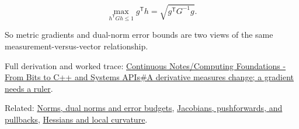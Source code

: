 \[
\max_{h^{\mathsf T}Gh\le1} g^{\mathsf T}h
=
\sqrt{g^{\mathsf T}G^{-1}g}.
\]

So metric gradients and dual-norm error bounds are two views of the same measurement-versus-vector relationship.

Full derivation and worked trace: \href{Continuous\%20Notes/Computing\%20Foundations\%20-\%20From\%20Bits\%20to\%20C++\%20and\%20Systems\%20APIs\#A\%20derivative\%20measures\%20change;\%20a\%20gradient\%20needs\%20a\%20ruler}{Continuous Notes/Computing Foundations - From Bits to C++ and Systems APIs\#A derivative measures change; a gradient needs a ruler}.

Related: \hyperref[appendix-d6d9dbbe3c14]{Norms, dual norms and error budgets}, \hyperref[appendix-d8a7ddb675eb]{Jacobians, pushforwards, and pullbacks}, \hyperref[appendix-6ac071f8b50c]{Hessians and local curvature}.
